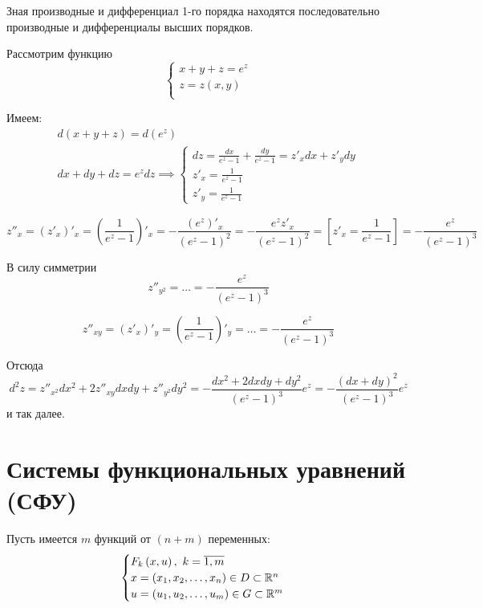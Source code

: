 \documentclass[../../main.tex]{subfiles}
\begin{document}
\begin{exmp}
Зная производные и дифференциал 1-го порядка находятся последовательно
производные и дифференциалы высших порядков.


Рассмотрим функцию
\[\begin{cases}
    x + y + z = e^z \\
    z = z\left(x, y\right) \\
\end{cases}\]

Имеем:
\[
\begin{array}{l}
d\left(x + y + z\right) = d(e^z) \\
dx + dy + dz = e^zdz \implies 
\begin{cases}
dz = \frac{dx}{e^z - 1}
+ \frac{dy}{e^z - 1} = z'_xdx + z'_ydy \\
z'_x = \frac{1}{e^z - 1}\\
z'_y = \frac{1}{e^z - 1}
\end{cases}
\end{array}
\]

\[z''_x = \left(z'_x\right)'_x = \left(\frac{1}{e^z - 1}\right)'_x
= -\frac{\left(e^z\right)'_x}{\left(e^z - 1\right)^2} =
- \frac{e^zz'_x}{\left(e^z - 1\right)^2} = \left[z'_x
= \frac{1}{e^z - 1} \right] =
- \frac{e^z}{\left(e^z - 1\right)^3}\]

В силу симметрии \[\displaystyle z''_{y^2} = \dots = - 
\frac{e^z}{\left(e^z - 1\right)^3}\]

\[z''_{xy} = \left(z'_x\right)'_y = \left(\frac{1}{e^z - 1} \right)'_y =
\dots = - \frac{e^z}{\left(e^z - 1\right)^3}\]

Отсюда
\[d^2z = z''_{x^2}dx^2 + 2z''_{xy}dxdy + z''_{y^2}dy^2 =
-\frac{dx^2 + 2dxdy + dy^2}{\left(e^z - 1\right)^3} e^z = 
-\frac{\left(dx + dy\right)^2}{\left(e^z - 1\right)^3} e^z\]
и так далее.
\end{exmp}

\section{Системы функциональных уравнений (СФУ)}
Пусть имеется $m$ функций от $\left(n + m\right)$ переменных:
\[\begin{cases}
    F_k\left(x, u \right),\ k = \overline{1, m} \\
    x = \left(x_1, x_2, \dots, x_n\right) \in D \subset \mathbb{R}^n \\
    u = \left(u_1, u_2, \dots, u_m\right) \in G \subset \mathbb{R}^m
\end{cases}
\]
\end{document}
